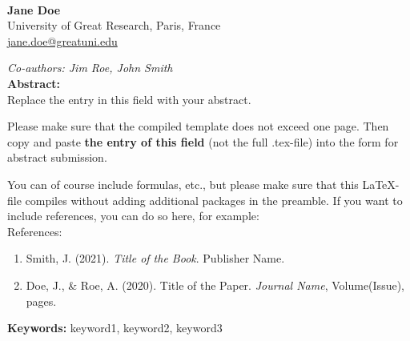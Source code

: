 \documentclass[letterpaper,12pt]{article}
\newcommand{\abstracttext}{Replace the entry in this field with your abstract. 
	
	Please make sure that the compiled template does not exceed one page. Then copy and paste \textbf{the entry of this field} (not the full .tex-file) into the form for abstract submission.
	
	You can of course include formulas, etc., but please make sure that this \LaTeX{}-file compiles without adding additional packages in the preamble. If you want to include references, you can do so here, for example: \\[0.5cm]
	References:
	\begin{enumerate}
		\item Smith, J. (2021). \textit{Title of the Book}. Publisher Name.
		\item Doe, J., \& Roe, A. (2020). Title of the Paper. \textit{Journal Name}, Volume(Issue), pages.
\end{enumerate}}
\begin{document}
	\begin{center}
		 \\[0.5cm]
		{\large\textbf{Jane Doe}} \\[0.2cm]
	University of Great Research, Paris, France  \\ \href{mailto:jane.doe@greatuni.edu}{jane.doe@greatuni.edu}
	\end{center}
	
	\vspace{0.2cm}
	
	\textit{Co-authors: Jim Roe, John Smith} \\[0.2cm]
	
	\textbf{Abstract:} \\[0.2cm]
	\abstracttext
	
	\vspace{0.5cm}
	\textbf{Keywords:} keyword1, keyword2, keyword3
	
\end{document}
